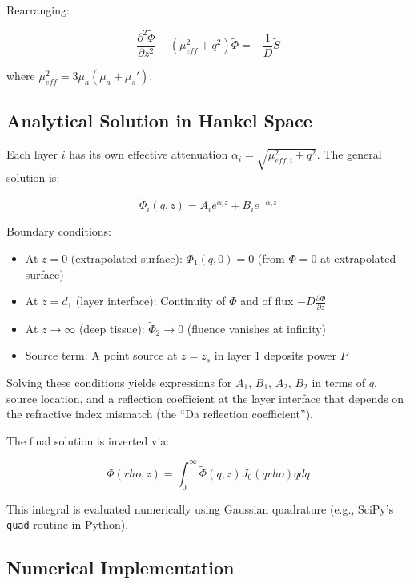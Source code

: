 \documentclass[12pt]{article}
\def\rho{rho}%
\def\mathrm#1{#1}%
\def\,{ }%
\begin{document}
Rearranging:

\begin{equation}
\frac{\partial^2 \tilde{\Phi}}{\partial z^2} - (\mu_{\mathrm{eff}}^2 + q^2) \tilde{\Phi} = -\frac{1}{D} \tilde{S}
\end{equation}

where $\mu_{\mathrm{eff}}^2 = 3 \mu_a (\mu_a + \mu_s')$.

\subsection{Analytical Solution in Hankel Space}

Each layer $i$ has its own effective attenuation $\alpha_i = \sqrt{\mu_{\mathrm{eff},i}^2 + q^2}$. The general solution is:

\begin{equation}
\tilde{\Phi}_i(q, z) = A_i e^{\alpha_i z} + B_i e^{-\alpha_i z}
\end{equation}

Boundary conditions:
\begin{itemize}
\item At $z = 0$ (extrapolated surface): $\tilde{\Phi}_1(q, 0) = 0$ (from $\Phi = 0$ at extrapolated surface)
\item At $z = d_1$ (layer interface): Continuity of $\Phi$ and of flux $-D \frac{\partial \Phi}{\partial z}$
\item At $z \to \infty$ (deep tissue): $\tilde{\Phi}_2 \to 0$ (fluence vanishes at infinity)
\item Source term: A point source at $z = z_s$ in layer 1 deposits power $P$
\end{itemize}

Solving these conditions yields expressions for $A_1$, $B_1$, $A_2$, $B_2$ in terms of $q$, source location, and a reflection coefficient at the layer interface that depends on the refractive index mismatch (the ``Da reflection coefficient'').

The final solution is inverted via:

\begin{equation}
\Phi(\rho, z) = \int_0^{\infty} \tilde{\Phi}(q, z) \, J_0(q\rho) \, q \, dq
\end{equation}

This integral is evaluated numerically using Gaussian quadrature (e.g., SciPy's \texttt{quad} routine in Python).

\subsection{Numerical Implementation}
\end{document}

